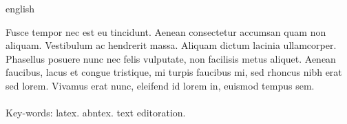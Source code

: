 
\begin{resumo}[Abstract]
\begin{otherlanguage*}{english}

Fusce tempor nec est eu tincidunt. Aenean consectetur accumsan quam non aliquam. Vestibulum ac hendrerit massa. Aliquam dictum lacinia ullamcorper. Phasellus posuere nunc nec felis vulputate, non facilisis metus aliquet. Aenean faucibus, lacus et congue tristique, mi turpis faucibus mi, sed rhoncus nibh erat sed lorem. Vivamus erat nunc, eleifend id lorem in, euismod tempus sem.
\\\\
\noindent
Key-words: latex. abntex. text editoration.

\end{otherlanguage*}
\end{resumo}